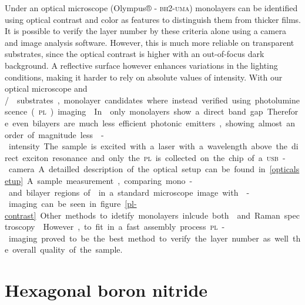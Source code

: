 Under an optical microscope (Olympus® - \textsc{bh}2-\textsc{uma}) monolayers can be identified using optical contrast and color as features to distinguish them from thicker films. It is possible to verify the layer number by these criteria alone using a camera and image analysis software\cite{funk_spectroscopy_2017}. However, this is much more reliable on transparent substrates, since the optical contrast is higher with an out-of-focus dark background. A reflective surface however enhances variations in the lighting conditions, making it harder to rely on absolute values of intensity. With our optical microscope and \si/\sio substrates, monolayer candidates where instead verified using photoluminescence (\textsc{pl}) imaging\cite{neumann_opto-valleytronic_2017}. In \tmds only monolayers show a direct band gap. Therefore even bilayers are much less efficient photonic emitters, showing almost an order of magnitude less \pl-intensity. The sample is excited with a laser with a wavelength above the direct exciton resonance and only the \textsc{pl} is collected on the chip of a \textsc{usb}-camera. A detailled description of the optical setup can be found in \ref{opticalsetup}. A sample measurement, comparing mono- and bilayer regions of \wse in a standard microscope image with \pl-imaging can be seen in figure \ref{pl-contrast}. 

Other methods to idetify monolayers inlcude both \pl and Raman spectroscopy\cite{zhao_lattice_2013,zhang_phonon_2015,tonndorf_photoluminescence_2013}. However, to fit in a fast assembly process \textsc{pl}-imaging proved to be the best method to verify the layer number as well the overall quality of the sample.

\section{Hexagonal boron nitride}

